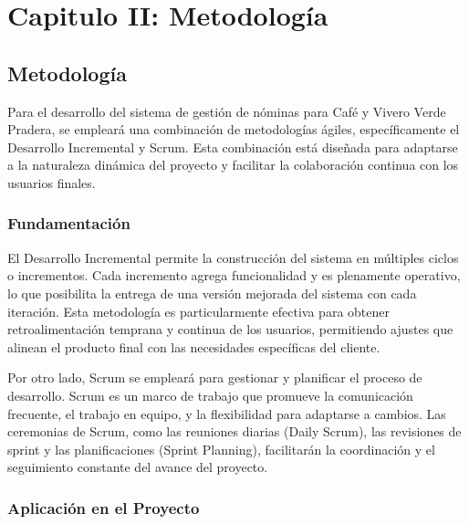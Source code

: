 \chapter{\textbf{Capitulo II: Metodología}}
\section{Metodología}
Para el desarrollo del sistema de gestión de nóminas para Café y
Vivero Verde Pradera, se empleará una combinación de metodologías ágiles,
específicamente el Desarrollo Incremental y Scrum. Esta combinación está
diseñada para adaptarse a la naturaleza dinámica del proyecto y facilitar
la colaboración continua con los usuarios finales.

\subsection{Fundamentación}

El Desarrollo Incremental permite la construcción del sistema en
múltiples ciclos o incrementos. Cada incremento agrega funcionalidad y
es plenamente operativo, lo que posibilita la entrega de una versión mejorada
del sistema con cada iteración. Esta metodología es particularmente efectiva
para obtener retroalimentación temprana y continua de los usuarios, permitiendo
ajustes que alinean el producto final con las necesidades específicas del cliente.

Por otro lado, Scrum se empleará para gestionar y planificar el proceso de
desarrollo. Scrum es un marco de trabajo que promueve la comunicación frecuente,
el trabajo en equipo, y la flexibilidad para adaptarse a cambios. Las ceremonias
de Scrum, como las reuniones diarias (Daily Scrum), las revisiones de sprint y
las planificaciones (Sprint Planning), facilitarán la coordinación y el
seguimiento constante del avance del proyecto.

\newpage

\subsection*{Aplicación en el Proyecto}


